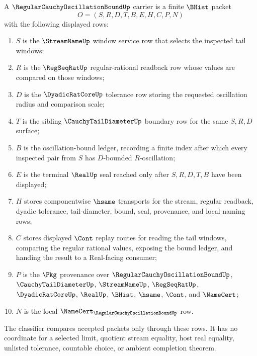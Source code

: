 \begin{definition}
\label{def:regular-cauchy-oscillation-bound-carrier}
A $\RegularCauchyOscillationBoundUp$ carrier is a finite $\BHist$ packet
$$
O=(S,R,D,T,B,E,H,C,P,N)
$$
with the following displayed rows:
\begin{enumerate}
\item $S$ is the $\StreamNameUp$ window service row that selects the inspected tail windows;
\item $R$ is the $\RegSeqRatUp$ regular-rational readback row whose values are compared on those windows;
\item $D$ is the $\DyadicRatCoreUp$ tolerance row storing the requested oscillation radius and comparison scale;
\item $T$ is the sibling $\CauchyTailDiameterUp$ boundary row for the same $S,R,D$ surface;
\item $B$ is the oscillation-bound ledger, recording a finite index after which every inspected pair from $S$ has $D$-bounded $R$-oscillation;
\item $E$ is the terminal $\RealUp$ seal reached only after $S,R,D,T,B$ have been displayed;
\item $H$ stores componentwise $\hsame$ transports for the stream, regular readback, dyadic tolerance, tail-diameter, bound, seal, provenance, and local naming rows;
\item $C$ stores displayed $\Cont$ replay routes for reading the tail windows, comparing the regular rational values, exposing the bound ledger, and handing the result to a Real-facing consumer;
\item $P$ is the $\Pkg$ provenance over $\RegularCauchyOscillationBoundUp$, $\CauchyTailDiameterUp$, $\StreamNameUp$, $\RegSeqRatUp$, $\DyadicRatCoreUp$, $\RealUp$, $\BHist$, $\hsame$, $\Cont$, and $\NameCert$;
\item $N$ is the local $\NameCert_{\RegularCauchyOscillationBoundUp}$ row.
\end{enumerate}
The classifier compares accepted packets only through these rows. It has no coordinate for a selected limit, quotient stream equality, host real equality, unlisted tolerance, countable choice, or ambient completion theorem.
\end{definition}

